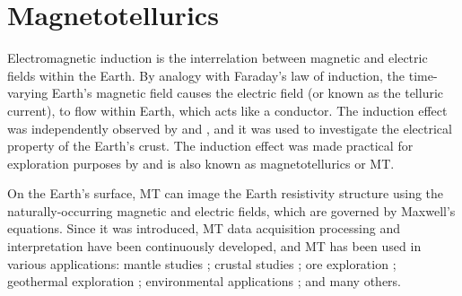 
\section{Magnetotellurics}\label{sect:mt_background}


		Electromagnetic induction is the interrelation between magnetic and electric fields within the Earth.
		By analogy with Faraday's law of induction, the time-varying Earth's magnetic field causes the electric field (or known as the telluric current), to flow within Earth, which acts like a conductor. 
		The induction effect was independently observed by \citet{rikitake1946a} and \citet{tikhonov1950a}, and it was used to investigate the electrical property of the Earth's crust.
		The induction effect was made practical for exploration purposes by \citet{cagniard1953a} and is also known as magnetotellurics or MT.

		On the Earth's surface, MT can image the Earth resistivity structure using the naturally-occurring magnetic and electric fields, which are governed by Maxwell's equations. 
		Since it was introduced, MT data acquisition processing and interpretation have been continuously developed, and MT has been used in various applications:
		mantle studies \citep[e.g.,][]{berdichevsky1980a, baba2010a};
		crustal studies \citep[e.g.,][]{heise2007a, unsworth2010a,boonchaisuk2013a};
		ore exploration \citep[e.g.][]{tuncer2006a, turkoglu2009a};
		geothermal exploration \citep[e.g.,][]{pellerin1996a, heise2008a, amatyakul2015a};
		environmental applications \citep[e.g.,][]{unsworth2007a};
		and many others.
	
